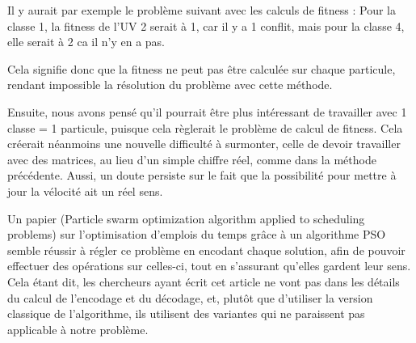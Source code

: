Il y aurait par exemple le problème suivant avec les calculs de fitness : Pour la classe 1, la fitness de l'UV 2 serait à 1, car il y a 1 conflit, mais pour la classe 4, elle serait à 2 ca il n'y en a pas.

Cela signifie donc que la fitness ne peut pas être calculée sur chaque particule, rendant impossible la résolution du problème avec cette méthode.

Ensuite, nous avons pensé qu'il pourrait être plus intéressant de travailler avec 1 classe = 1 particule, puisque cela règlerait le problème de calcul de fitness.
Cela créerait néanmoins une nouvelle difficulté à surmonter, celle de devoir travailler avec des matrices, au lieu d'un simple chiffre réel, comme dans la méthode précédente.
Aussi, un doute persiste sur le fait que la possibilité pour mettre à jour la vélocité ait un réel sens.

Un papier (Particle swarm optimization algorithm applied to scheduling problems\cite{pongchairerks2009particle}) sur l'optimisation d'emplois du temps grâce à un algorithme PSO semble réussir à régler ce problème en encodant chaque solution, afin de pouvoir effectuer des opérations sur celles-ci, tout en s'assurant qu'elles gardent leur sens.
Cela étant dit, les chercheurs ayant écrit cet article ne vont pas dans les détails du calcul de l'encodage et du décodage, et, plutôt que d'utiliser la version classique de l'algorithme, ils utilisent des variantes qui ne paraissent pas applicable à notre problème.

